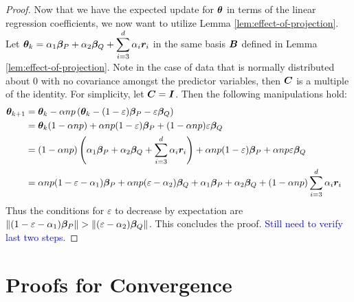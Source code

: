\documentclass{article} %
\newcommand{\norm}[1]{\left\lVert#1\right\rVert}
\begin{document}
\begin{appendices}
\begin{proof}
		Now that we have the expected update for ${\bm{\theta}}$ in terms of the linear regression coefficients, we now want to utilize Lemma \ref{lem:effect-of-projection}.\\
		Let $\displaystyle {\bm{\theta}}_k = \alpha_1{\bm{\beta}}_P + \alpha_2{\bm{\beta}}_Q + \sum_{i=3}^{d}\alpha_i {\bm{r}}_i$ in the same basis ${\bm{B}}$ defined in Lemma \ref{lem:effect-of-projection}. Note in the case of data that is normally distributed about $0$ with no covariance amongst the predictor variables, then ${\bm{C}}$ is a multiple of the identity. For simplicity, let ${\bm{C}} = {\bm{I}}$. Then the following manipulations hold:
		\begin{align}
			{\bm{\theta}}_{k+1} &= {\bm{\theta}}_k - \alpha np\left({\bm{\theta}}_k - (1-\varepsilon){\bm{\beta}}_P - \varepsilon {\bm{\beta}}_Q\right) &&\\
			&= {\bm{\theta}}_k(1-\alpha np) + \alpha np (1-\varepsilon){\bm{\beta}}_P + (1-\alpha np)\varepsilon{\bm{\beta}}_Q &&\\
			&= (1-\alpha n p)\left(\alpha_1 {\bm{\beta}}_P + \alpha_2 {\bm{\beta}}_Q + \sum_{i=3}^d\alpha_i{\bm{r}}_i\right) + \alpha np(1-\varepsilon){\bm{\beta}}_P + \alpha np\varepsilon{\bm{\beta}}_Q &&\\
			&= \alpha np (1-\varepsilon - \alpha_1){\bm{\beta}}_P + \alpha np (\varepsilon - \alpha_2){\bm{\beta}}_Q + \alpha_1 {\bm{\beta}}_P + \alpha_2 {\bm{\beta}}_Q + (1 - \alpha np)\sum_{i=3}^d\alpha_i{\bm{r}}_i &&
		\end{align}
		Thus the conditions for $\varepsilon$ to decrease by expectation are  $\displaystyle \norm{(1-\varepsilon - \alpha_1)\vbeta_P} > \norm{(\varepsilon - \alpha_2)\vbeta_Q}$. This concludes the proof. \textcolor{blue}{Still need to verify last two steps.}
	\end{proof}
	\newpage
	
	\section{Proofs for Convergence}
	\label{app:convergence-proofs}

\end{appendices}
\end{document}
